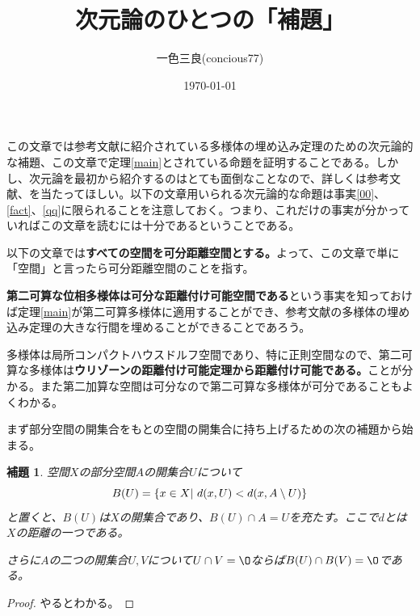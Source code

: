 \documentclass[leqno]{jsarticle}
\title{次元論のひとつの「補題」}
\author{一色三良(concious77)}
\date{\today}
\newtheorem{lem}[thm]{補題}
\begin{document}
\maketitle
この文章では参考文献\cite{0}に紹介されている多様体の埋め込み定理のための次元論的な補題、この文章で定理\ref{main}とされている命題を証明することである。しかし、次元論を最初から紹介するのはとても面倒なことなので、詳しくは参考文献\cite{-1}、\cite{1}を当たってほしい。以下の文章用いられる次元論的な命題は事実\ref{00}、\ref{fact}、\ref{qq}に限られることを注意しておく。つまり、これだけの事実が分かっていればこの文章を読むには十分であるということである。\par
以下の文章では\textbf{すべての空間を可分距離空間とする。}よって、この文章で単に「空間」と言ったら可分距離空間のことを指す。\par
\textbf{第二可算な位相多様体は可分な距離付け可能空間である}という事実を知っておけば定理\ref{main}が第二可算多様体に適用することができ、参考文献\cite{0}の多様体の埋め込み定理の大きな行間を埋めることができることであろう。\par
多様体は局所コンパクトハウスドルフ空間であり、特に正則空間なので、第二可算な多様体は\textbf{ウリゾーンの距離付け可能定理から距離付け可能である。}ことが分かる。また第二加算な空間は可分なので第二可算な多様体が可分であることもよくわかる。
\par まず部分空間の開集合をもとの空間の開集合に持ち上げるための次の補題から始まる。

\begin{lem}\label{lem}
空間$X$の部分空間$A$の開集合$U$について
\[
B(U)=\{x\in X\\ |\ d(x,U)<d(x,A\setminus U)\}
\]
と置くと、$B(U)$は$X$の開集合であり、$B(U)\cap A=U$を充たす。ここで$d$とは$X$の距離の一つである。\par
さらに$A$の二つの開集合$U,V$について$U\cap V=\O$ならば$B(U)\cap B(V)=\O$である。
\end{lem}
\begin{proof}
やるとわかる。
\end{proof}
\end{document}
